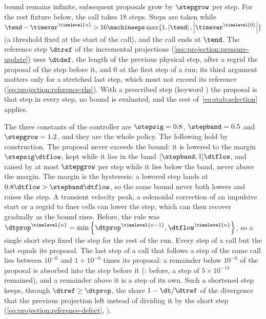 bound remains infinite, subsequent proposals grow by $\stepgrow$ per step.
For the rest fixture below, the call takes $18$ steps. Steps are
taken while
$\tend-\timevar^{\timelevel{n}}>16\machineeps\max\{1,\abs{\tend},\abs{\timevar^{\timelevel{0}}}\}$
(a threshold fixed at the start of the call),
and the call ends at $\tend$. The reference step $\dtref$ of the incremental
projections (\cref{sec:projection:pressure-update}) uses $\dtdef$, the length
of the previous physical step, after a regrid the proposal of the step before
it, and $0$ at the first step of a run; its third argument matters only for
a stretched last step, which must not exceed its reference
(\cref{eq:projection:reference-rhs}). With a prescribed step (keyword
) the proposal is that step in every step, no bound is evaluated,
and the rest of~\cref{eq:stab:selection} applies.

The three constants of the controller are $\stepsig=0.8$, $\stepband=0.5$
and $\stepgrow=1.2$, and they are the whole policy. The following hold by
construction. The proposal never exceeds the bound: it is lowered to the
margin $\stepsig\dtflow$, kept while it lies in the band
$[\stepband,1]\dtflow$, and raised by at most $\stepgrow$ per step while it
lies below the band, never above the margin. The margin is the hysteresis: a
lowered step lands at $0.8\dtflow>\stepband\dtflow$, so the same bound never
both lowers and raises the step. A transient velocity peak, a solenoidal
correction of an impulsive start or a regrid to finer cells can lower the
step, which can then recover gradually as the bound rises. Before, the rule was
${\dtprop}^{\timelevel{n}}=\min\curlypar{{\dtprop}^{\timelevel{n-1}},\dtflow^{\timelevel{n}}}$,
so a single short step fixed the step for the rest of the run.
Every step of a call but the last equals its proposal. The last step of a call that follows a step of the same
call lies between $10^{-6}$ and $1+10^{-6}$ times its proposal: a remainder
below $10^{-6}$ of the proposal is absorbed into the step before it
(: before, a step of $5\times10^{-14}$ remained), and a remainder
above it is a step of its own. Such a shortened step keeps, through
$\dtref\ge\dtprop$, the share $1-\dt/\dtref$ of the divergence that the previous
projection left instead of dividing it by the short step
(\cref{eq:projection:reference-defect}, ).

